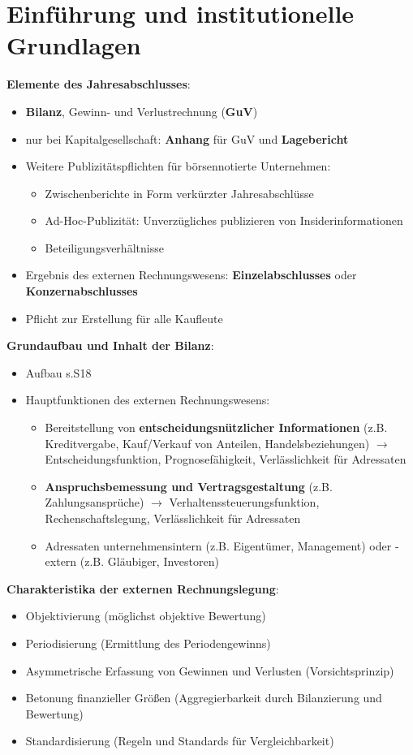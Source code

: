 \section{Einführung und institutionelle Grundlagen}

\textbf{Elemente des Jahresabschlusses}: 
\begin{itemize}
	\item \textbf{Bilanz}, Gewinn- und Verlustrechnung (\textbf{GuV})
	\item nur bei Kapitalgesellschaft: \textbf{Anhang} für GuV und \textbf{Lagebericht}
	\item Weitere Publizitätspflichten für börsennotierte Unternehmen:
	\begin{itemize}
		\item Zwischenberichte in Form verkürzter Jahresabschlüsse
		\item Ad-Hoc-Publizität: Unverzügliches publizieren von Insiderinformationen
		\item Beteiligungsverhältnisse
	\end{itemize}
	\item Ergebnis des externen Rechnungswesens: \textbf{Einzelabschlusses} oder \textbf{Konzernabschlusses}
	\item Pflicht zur Erstellung für alle Kaufleute
\end{itemize}
\bigskip
\textbf{Grundaufbau und Inhalt der Bilanz}:
\begin{itemize}
	\item Aufbau s.S18
	\item Hauptfunktionen des externen Rechnungswesens: 
	\begin{itemize}
		\item Bereitstellung von \textbf{entscheidungsnützlicher Informationen} (z.B. Kreditvergabe, Kauf/Verkauf von Anteilen, Handelsbeziehungen) $\rightarrow$ Entscheidungsfunktion, Prognosefähigkeit, Verlässlichkeit für Adressaten
		\item \textbf{Anspruchsbemessung und Vertragsgestaltung} (z.B. Zahlungsansprüche) $\rightarrow$ Verhaltenssteuerungsfunktion, Rechenschaftslegung, Verlässlichkeit für Adressaten
		\item Adressaten unternehmensintern (z.B. Eigentümer, Management) oder -extern (z.B. Gläubiger, Investoren)
	\end{itemize} 
\end{itemize}
\bigskip
\textbf{Charakteristika der externen Rechnungslegung}:
\begin{itemize}
	\item Objektivierung (möglichst objektive Bewertung)
	\item Periodisierung (Ermittlung des Periodengewinns)
	\item Asymmetrische Erfassung von Gewinnen und Verlusten (Vorsichtsprinzip)
	\item Betonung finanzieller Größen (Aggregierbarkeit durch Bilanzierung und Bewertung)
	\item Standardisierung (Regeln und Standards für Vergleichbarkeit)
\end{itemize}
